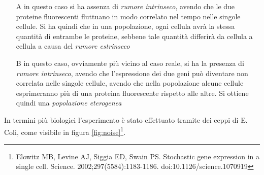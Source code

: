 \documentclass[a4paper,12pt, oneside]{book}
\begin{document}
\begin{enumerate}
  \item[A] in questo caso si ha assenza di \textit{rumore intrinseco}, avendo
  che le due proteine 
  fluorescenti fluttuano in modo correlato nel tempo nelle singole cellule. Si
  ha quindi che in una popolazione, ogni cellula avrà la stessa quantità di
  entrambe le proteine, sebbene tale quantità differirà da cellula a cellula a
  causa del \textit{rumore estrinseco} 
  \item[B] in questo caso, ovviamente più vicino al caso reale, si ha la
  presenza di \textit{rumore intrinseco}, avendo che l'espressione dei due geni
  può diventare non correlata nelle singole cellule, avendo che nella
  popolazione alcune cellule esprimeranno più di una proteina fluorescente
  rispetto alle altre. Si ottiene quindi una \textit{popolazione eterogenea} 
\end{enumerate}
In termini più biologici l'esperimento è stato effettuato tramite dei ceppi di
E. Coli, come visibile in figura \ref{fig:noise}\footnote{Elowitz MB, Levine AJ,
  Siggia ED, Swain PS. Stochastic gene expression in a single 
  cell. Science. 2002;297(5584):1183-1186. doi:10.1126/science.1070919}. 
\end{document}
